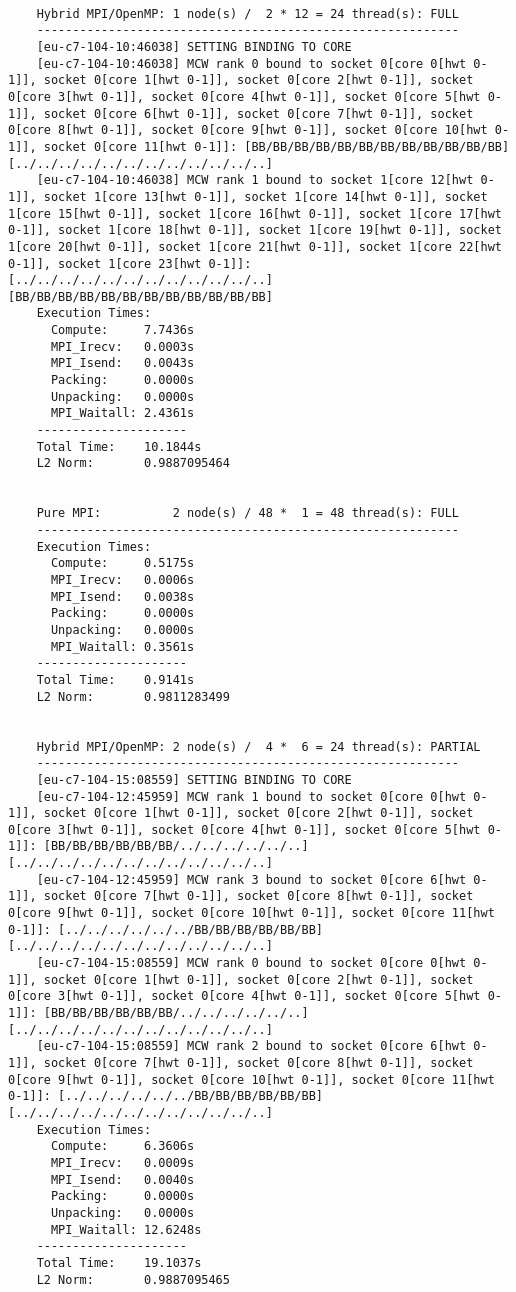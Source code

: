 \documentclass[11pt,a4paper]{article}
\begin{document}
\begin{lstlisting}
	
	Hybrid MPI/OpenMP: 1 node(s) /  2 * 12 = 24 thread(s): FULL
	-----------------------------------------------------------
	[eu-c7-104-10:46038] SETTING BINDING TO CORE
	[eu-c7-104-10:46038] MCW rank 0 bound to socket 0[core 0[hwt 0-1]], socket 0[core 1[hwt 0-1]], socket 0[core 2[hwt 0-1]], socket 0[core 3[hwt 0-1]], socket 0[core 4[hwt 0-1]], socket 0[core 5[hwt 0-1]], socket 0[core 6[hwt 0-1]], socket 0[core 7[hwt 0-1]], socket 0[core 8[hwt 0-1]], socket 0[core 9[hwt 0-1]], socket 0[core 10[hwt 0-1]], socket 0[core 11[hwt 0-1]]: [BB/BB/BB/BB/BB/BB/BB/BB/BB/BB/BB/BB][../../../../../../../../../../../..]
	[eu-c7-104-10:46038] MCW rank 1 bound to socket 1[core 12[hwt 0-1]], socket 1[core 13[hwt 0-1]], socket 1[core 14[hwt 0-1]], socket 1[core 15[hwt 0-1]], socket 1[core 16[hwt 0-1]], socket 1[core 17[hwt 0-1]], socket 1[core 18[hwt 0-1]], socket 1[core 19[hwt 0-1]], socket 1[core 20[hwt 0-1]], socket 1[core 21[hwt 0-1]], socket 1[core 22[hwt 0-1]], socket 1[core 23[hwt 0-1]]: [../../../../../../../../../../../..][BB/BB/BB/BB/BB/BB/BB/BB/BB/BB/BB/BB]
	Execution Times:
	  Compute:     7.7436s
	  MPI_Irecv:   0.0003s
	  MPI_Isend:   0.0043s
	  Packing:     0.0000s
	  Unpacking:   0.0000s
	  MPI_Waitall: 2.4361s
	---------------------
	Total Time:    10.1844s
	L2 Norm:       0.9887095464
	
	
	Pure MPI:          2 node(s) / 48 *  1 = 48 thread(s): FULL
	-----------------------------------------------------------
	Execution Times:
	  Compute:     0.5175s
	  MPI_Irecv:   0.0006s
	  MPI_Isend:   0.0038s
	  Packing:     0.0000s
	  Unpacking:   0.0000s
	  MPI_Waitall: 0.3561s
	---------------------
	Total Time:    0.9141s
	L2 Norm:       0.9811283499
	
	
	Hybrid MPI/OpenMP: 2 node(s) /  4 *  6 = 24 thread(s): PARTIAL 
	-----------------------------------------------------------
	[eu-c7-104-15:08559] SETTING BINDING TO CORE
	[eu-c7-104-12:45959] MCW rank 1 bound to socket 0[core 0[hwt 0-1]], socket 0[core 1[hwt 0-1]], socket 0[core 2[hwt 0-1]], socket 0[core 3[hwt 0-1]], socket 0[core 4[hwt 0-1]], socket 0[core 5[hwt 0-1]]: [BB/BB/BB/BB/BB/BB/../../../../../..][../../../../../../../../../../../..]
	[eu-c7-104-12:45959] MCW rank 3 bound to socket 0[core 6[hwt 0-1]], socket 0[core 7[hwt 0-1]], socket 0[core 8[hwt 0-1]], socket 0[core 9[hwt 0-1]], socket 0[core 10[hwt 0-1]], socket 0[core 11[hwt 0-1]]: [../../../../../../BB/BB/BB/BB/BB/BB][../../../../../../../../../../../..]
	[eu-c7-104-15:08559] MCW rank 0 bound to socket 0[core 0[hwt 0-1]], socket 0[core 1[hwt 0-1]], socket 0[core 2[hwt 0-1]], socket 0[core 3[hwt 0-1]], socket 0[core 4[hwt 0-1]], socket 0[core 5[hwt 0-1]]: [BB/BB/BB/BB/BB/BB/../../../../../..][../../../../../../../../../../../..]
	[eu-c7-104-15:08559] MCW rank 2 bound to socket 0[core 6[hwt 0-1]], socket 0[core 7[hwt 0-1]], socket 0[core 8[hwt 0-1]], socket 0[core 9[hwt 0-1]], socket 0[core 10[hwt 0-1]], socket 0[core 11[hwt 0-1]]: [../../../../../../BB/BB/BB/BB/BB/BB][../../../../../../../../../../../..]
	Execution Times:
	  Compute:     6.3606s
	  MPI_Irecv:   0.0009s
	  MPI_Isend:   0.0040s
	  Packing:     0.0000s
	  Unpacking:   0.0000s
	  MPI_Waitall: 12.6248s
	---------------------
	Total Time:    19.1037s
	L2 Norm:       0.9887095465
	

\end{lstlisting}
\end{document}
